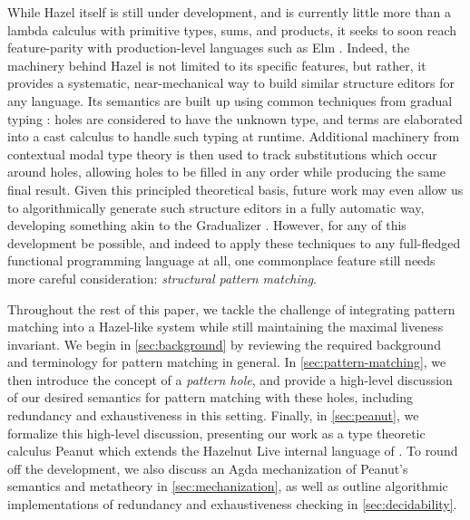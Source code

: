 While Hazel itself is still under development, and is currently little more than a lambda calculus with primitive types, sums, and products, it seeks to soon reach feature-parity with production-level languages such as Elm \cite{DBLP:conf/pldi/CzaplickiC13, Elm, DBLP:journals/pacmpl/OmarVCH19}. Indeed, the machinery behind Hazel is not limited to its specific features, but rather, it provides a systematic, near-mechanical way to build similar structure editors for any language. Its semantics are built up using common techniques from gradual typing \cite{DBLP:conf/snapl/SiekVCB15}: holes are considered to have the unknown type, and terms are elaborated into a cast calculus to handle such typing at runtime. Additional machinery from contextual modal type theory \cite{DBLP:journals/tocl/NanevskiPP08} is then used to track substitutions which occur around holes, allowing holes to be filled in any order while producing the same final result. Given this principled theoretical basis, future work may even allow us to algorithmically generate such structure editors in a fully automatic way, developing something akin to the Gradualizer \cite{DBLP:conf/popl/CiminiS16}. However, for any of this development be possible, and indeed to apply these techniques to any full-fledged functional programming language at all, one commonplace feature still needs more careful consideration: \emph{structural pattern matching}.

Throughout the rest of this paper, we tackle the challenge of integrating pattern matching into a Hazel-like system while still maintaining the maximal liveness invariant. We begin in \autoref{sec:background} by reviewing the required background and terminology for pattern matching in general. In \autoref{sec:pattern-matching}, we then introduce the concept of a \emph{pattern hole}, and provide a high-level discussion of our desired semantics for pattern matching with these holes, including redundancy and exhaustiveness in this setting. Finally,  in \autoref{sec:peanut}, we formalize this high-level discussion, presenting our work as a type theoretic calculus Peanut which extends the Hazelnut Live internal language 
of \cite{DBLP:journals/pacmpl/OmarVCH19}. To round off the development, we also discuss an Agda mechanization of Peanut's semantics and metatheory in \autoref{sec:mechanization}, as well as outline algorithmic implementations of redundancy and exhaustiveness checking in \autoref{sec:decidability}.
